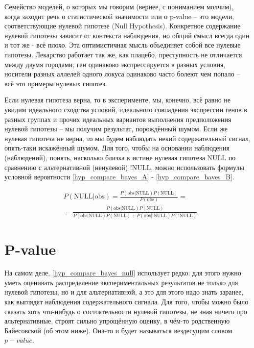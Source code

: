 \documentclass{book}
\begin{document}
Семейство моделей, о которых мы говорим (вернее, с пониманием молчим), когда заходит речь о статистической значимости или о p-value -- это модели, соответствующие нулевой гипотезе (Null Hypothesis). Конкретное содержание нулевой гипотезы зависит от контекста наблюдения, но общий смысл всегда один и тот же - всё плохо. Эта оптимистичная мысль объединяет собой все нулевые гипотезы. Лекарство работает так же, как плацебо, преступность не отличается между двумя городами, ген одинаково экспрессируется в разных условия, носители разных аллелей одного локуса одинаково часто болеют чем попало -- всё это примеры нулевых гипотез. 

Если нулевая гипотеза верна, то в эксперименте, мы, конечно, всё равно не увидим идеального сходства условий, идеального совпадения экспрессии генов в разных группах и прочих идеальных вариантов выполнения предположения нулевой гипотезы -- мы получим результат, порождённый шумом. Если же нулевая гипотеза не верна, то мы будем наблюдать некий содержательный сигнал, опять-таки искажённый шумом. Для того, чтобы на основании наблюдения (наблюдений), понять, насколько близка к истине нулевая гипотеза $\text{NULL}$ по сравнению с альтернативной (ненулевой) $\text{!NULL}$, можно использовать формулы условной вероятности \eqref{hyp_compare_bayes_A} - \eqref{hyp_compare_bayes_B}. 

\begin{align}\label{hyp_compare_bayes_null}
   &P\left(\text{NULL|obs}\right)=
   \frac{P\left(\text{obs|NULL}\right) P\left(\text{NULL}\right)}{P\left(\text{obs}\right)} = \nonumber \\
   &=\frac{P\left(\text{obs|NULL}\right) P\left(\text{NULL}\right)}{P\left(\text{obs|NULL}\right) P\left(\text{NULL}\right)+P\left(\text{obs|!NULL}\right) P\left(\text{!NULL}\right)} 
\end{align}

\section*{P-value}
На самом деле, \eqref{hyp_compare_bayes_null} использует редко: для этого нужно уметь оценивать распределение экспериментальных результатов не только для нулевой гипотезы, но и для альтернативной, а это для этого надо знать заранее, как выглядят наблюдения содержательного сигнала. Для того, чтобы можно было сказать хоть что-нибудь о состоятельности нулевой гипотезы, не зная ничего про альтернативные, строят сильно упрощённую оценку, в чём-то родственную Байесовской (об этом ниже). Она-то и будет называться вездесущим словом $p-value$.
\end{document}
